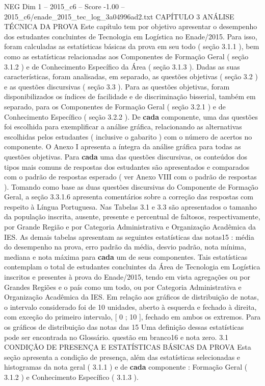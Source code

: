 \begin{textsample}{NEG Dim 1 – 2015\_c6 – Score -1.00 – 2015\_c6/enade\_2015\_tec\_log\_3a04996ad2.txt}  \label{ex:f1_neg_289}
CAPÍTULO 3 ANÁLISE TÉCNICA DA PROVA Este capítulo tem por objetivo apresentar o desempenho dos estudantes concluintes de Tecnologia em Logística no Enade/2015.
Para isso, foram calculadas as estatísticas básicas da prova em seu todo ( seção 3.1.1 ), bem como as estatísticas relacionadas aos Componentes de Formação Geral ( seção 3.1.2 ) e de Conhecimento Específico da Área ( seção 3.1.3 ).
Dadas as suas características, foram analisadas, em separado, as questões objetivas ( seção 3.2 ) e as questões discursivas ( seção 3.3 ).
Para as questões objetivas, foram disponibilizados os índices de facilidade e de discriminação bisserial, também em separado, para os Componentes de Formação Geral ( seção 3.2.1 ) e de Conhecimento Específico ( seção 3.2.2 ).
De \textbf{cada} componente, uma das questões foi escolhida para exemplificar a análise gráfica, relacionando as alternativas escolhidas pelos estudantes ( inclusive o gabarito ) com o número de acertos no componente.
O Anexo I apresenta a íntegra da análise gráfica para todas as questões objetivas.
Para \textbf{cada} uma das questões discursivas, os conteúdos dos tipos mais comuns de respostas dos estudantes são apresentados e comparados com o padrão de respostas esperado ( ver Anexo VIII com o padrão de respostas ).
Tomando como base as duas questões discursivas do Componente de Formação Geral, a seção 3.3.1.6 apresenta comentários sobre a correção das respostas com respeito à Língua Portuguesa.
Nas Tabelas 3.1 e 3.3 são apresentados o tamanho da população inscrita, ausente, presente e percentual de faltosos, respectivamente, por Grande Região e por Categoria Administrativa e Organização Acadêmica da IES.
As demais tabelas apresentam as seguintes estatísticas das notas15 : média do desempenho na prova, erro padrão da média, desvio padrão, nota mínima, mediana e nota máxima para \textbf{cada} um de seus componentes.
Tais estatísticas contemplam o total de estudantes concluintes da Área de Tecnologia em Logística inscritos e presentes à prova do Enade/2015, tendo em vista agregações ou por Grandes Regiões e o país como um todo, ou por Categoria Administrativa e Organização Acadêmica da IES.
Em relação aos gráficos de distribuição de notas, o intervalo considerado foi de 10 unidades, aberto à esquerda e fechado à direita, com exceção do primeiro intervalo, [ 0 ; 10 ], fechado em ambos os extremos.
Para os gráficos de distribuição das notas das 15 Uma definição dessas estatísticas pode ser encontrada no Glossário. questão em branco16 e nota zero. 3.1 CONDIÇÃO DE PRESENÇA E ESTATÍSTICAS BÁSICAS DA PROVA Esta seção apresenta a condição de presença, além das estatísticas selecionadas e histogramas da nota geral ( 3.1.1 ) e de \textbf{cada} componente : Formação Geral ( 3.1.2 ) e Conhecimento Específico ( 3.1.3 ).

\end{textsample}

